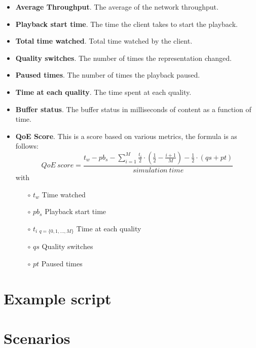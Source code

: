 \begin{itemize}[topsep=0pt, noitemsep]
    \item \textbf{Average Throughput}. The average of the network throughput.
    \item \textbf{Playback start time}. The time the client takes to start the playback.
    \item \textbf{Total time watched}. Total time watched by the client.
    \item \textbf{Quality switches}. The number of times the representation changed.
    \item \textbf{Paused times}. The number of times the playback paused.
    \item \textbf{Time at each quality}. The time spent at each quality.
    \item \textbf{Buffer status}. The buffer status in milliseconds of content as a function of time.
    \item \textbf{QoE Score}. This is a score based on various metrics, the formula is as follows:
    \begin{equation}
        QoE\ score = \frac{t_w-pb_s-\sum_{i=1}^{M} \frac{t_i}{2}\cdot (\frac{1}{2}-\frac{i+1}{M})-\frac{1}{2}\cdot (qs+pt)}{simulation\ time}
    \end{equation}
    with
    \begin{itemize}[topsep=0pt, noitemsep]
        \item[$\circ$] $t_w$ 		                            Time watched
        \item[$\circ$] $pb_s$ 		                            Playback start time
        \item[$\circ$] $t_i\ _{q=\{0,1,...,M\}}$ 		        Time at each quality 
        \item[$\circ$] $qs$ 		                            Quality switches
        \item[$\circ$] $pt$ 		                            Paused times
    \end{itemize}
\end{itemize}

\section{Example script}
\label{sec:example}


\section{Scenarios}
\label{sec:scenarios}

